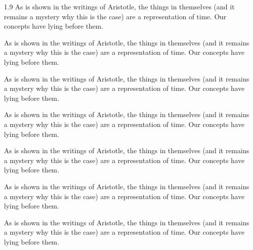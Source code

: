 \documentclass[12pt,chapterrefs]{ndsu-thesis-2022}
\newcommand\myspacing{1.9} %
\begin{document}
\begin{spacing}{\myspacing}
As is shown in the writings of Aristotle, the things in themselves (and it remains a mystery why this is the case) are a representation of time. Our concepts have lying before them.


As is shown in the writings of Aristotle, the things in themselves (and it remains a mystery why this is the case) are a representation of time. Our concepts have lying before them.

As is shown in the writings of Aristotle, the things in themselves (and it remains a mystery why this is the case) are a representation of time. Our concepts have lying before them.

\vspace{2ex}
\vspace{2ex}


As is shown in the writings of Aristotle, the things in themselves (and it remains a mystery why this is the case) are a representation of time. Our concepts have lying before them.

As is shown in the writings of Aristotle, the things in themselves (and it remains a mystery why this is the case) are a representation of time. Our concepts have lying before them.


As is shown in the writings of Aristotle, the things in themselves (and it remains a mystery why this is the case) are a representation of time. Our concepts have lying before them.

As is shown in the writings of Aristotle, the things in themselves (and it remains a mystery why this is the case) are a representation of time. Our concepts have lying before them.



\end{spacing}
\end{document}
